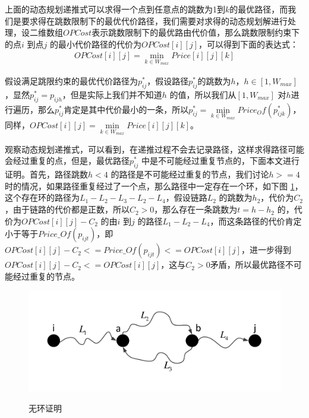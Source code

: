 上面的动态规划递推式可以求得一个点到任意点的跳数为1到$k$的最优路径，而我们是要求得在跳数限制下的最优代价路径，我们需要对求得的动态规划解进行处理，设二维数组$OPCost$表示跳数限制下的最优路由代价值，那么跳数限制约束下的点$i$ 到点$j$ 的最小代价路径的代价为$OPCost[i][j]$，可以得到下面的表达式：
\begin{equation}\label{best}
\begin{split}
OPCost[i][j]=\min\limits_{k \in W_{max}}{Price[i][j][k]}
\end{split}
\end{equation}

假设满足跳限约束的最优代价路径为$p_{ij}^*$，假设路径$p_{ij}^*$的跳数为$h$，$h \in [1,W_{max}]$，显然$p_{ij}^*=p_{ijh}$，但是实际上我们并不知道$h$ 的值，所以我们从$[1,W_{max}]$ 对$h$进行遍历，那么$p_{ij}^*$肯定是其中代价最小的一条，所以$p_{ij}^*=\min\limits_{k \in W_{max}}{Price_Of(p_{ijk}^*)}$，同样，$OPCost[i][j]=\min\limits_{k \in W_{max}}{Price[i][j][k]}$。

观察动态规划递推式，可以看到，在递推过程不会去记录路径，这样求得路径可能会经过重复的点，但是，最优路径$p_{ij}^*$ 中是不可能经过重复节点的，下面本文进行证明。首先，路径跳数$h<4$ 的路径是不可能经过重复的节点，我们讨论$h>=4$ 时的情况，如果路径重复经过了一个点，那么路径中一定存在一个环，如下图 \ref{prof}，这个存在环的路径为$L_1-L_2-L_3-L_2-L_4$，假设链路$L_2$ 的跳数为$h_2$，代价为$C_2$，由于链路的代价都是正数，所以$C_2>0$，那么存在一条跳数为$t=h-h_2$ 的，代价为$OPCost[i][j]-C_2$ 的由$i$ 到$j$ 的路径$L_1-L_2-L_4$，而这条路径的代价肯定小于等于$Price\_Of(p_{ijt})$，即$OPCost[i][j]-C_2<=Price\_Of(p_{ijt})<=OPCost[i][j]$，进一步得到$OPCost[i][j]-C_2<=OPCost[i][j]$，这与$C_2>0$矛盾，所以最优路径不可能经过重复的节点。
\begin{figure}
\setlength{\belowcaptionskip}{-0.5cm}
\begin{center}
{\includegraphics[width=1 \textwidth]{figures/circle.pdf}}
\end{center}
\caption{{\footnotesize{无环证明}}}
\label{prof}
\end{figure}
